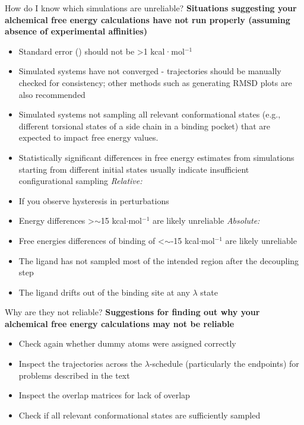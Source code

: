 \documentclass[9pt,bestpractices]{livecoms}
\begin{document}
\begin{Checklists*}
\begin{checklist}{How do I know which simulations are unreliable?}
    \textbf{Situations suggesting your alchemical free energy calculations have not run properly (assuming absence of experimental affinities)}
        \begin{itemize}
                \item Standard error (\textsigma) should not be \textgreater1 kcal·mol$^{-1}$ 
    \item Simulated systems have not converged - trajectories should be manually checked for consistency; other methods such as generating RMSD plots are also recommended
    \item Simulated systems not sampling all relevant conformational states (e.g., different torsional states of a side chain in a binding pocket) that are expected to impact free energy values.
    \item Statistically significant differences in free energy estimates from simulations starting from different initial states usually indicate insufficient configurational sampling
    \newline\newline\textit{Relative:}
    \item If you observe hysteresis in perturbations
    \item Energy differences \textgreater$\sim$15 kcal$\cdot$mol$^{-1}$  are likely unreliable
    \newline\newline\textit{Absolute:}
    \item Free energies differences of binding of \textless$\sim$-15 kcal$\cdot$mol$^{-1}$  are likely unreliable
    \item The ligand has not sampled most of the intended region after the decoupling step
    \item The ligand drifts out of the binding site at any $\lambda$ state
        \end{itemize}
\end{checklist}

\begin{checklist}{Why are they not reliable?}
    \textbf{Suggestions for finding out why your alchemical free energy calculations may not be reliable}
\begin{itemize}
    \item Check again whether dummy atoms were assigned correctly
    \item Inspect the trajectories across the $\lambda$-schedule (particularly the endpoints) for problems described in the text
    \item Inspect the overlap matrices for lack of overlap
    \item Check if all relevant conformational states are sufficiently sampled 
\end{itemize}
\end{checklist}


\end{Checklists*}
\end{document}
